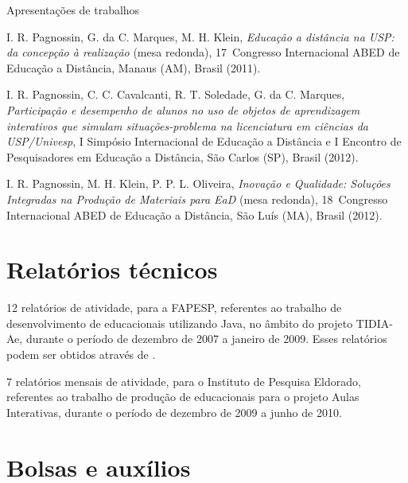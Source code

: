 \begin{compactitem}
	\item Apresentações de trabalhos
	\begin{compactitem}
		\item I. R. Pagnossin, G. da C. Marques, M. H. Klein, \textsl{Educação a distância na USP: da concepção à realização} (mesa redonda), 17\textordmasculine\ Congresso Internacional ABED de Educação a Distância, Manaus (AM), Brasil (2011).
		\item I. R. Pagnossin, C. C. Cavalcanti, R. T. Soledade, G. da C. Marques, \textsl{Participação e desempenho de alunos no uso de objetos de aprendizagem interativos que simulam situações-problema na licenciatura em ciências da USP/Univesp}, I Simpósio Internacional de Educação a Distância e I Encontro de Pesquisadores em Educação a Distância, São Carlos (SP), Brasil (2012).
		\item I. R. Pagnossin, M. H. Klein, P. P. L. Oliveira, \textsl{Inovação e Qualidade: Soluções Integradas na Produção de Materiais para EaD} (mesa redonda), 18\textordmasculine\ Congresso Internacional ABED de Educação a Distância, São Luís (MA), Brasil (2012).
	\end{compactitem}
\end{compactitem}

\section*{Relatórios técnicos}

\begin{compactitem}
	\item 12 relatórios de atividade, para a FAPESP, referentes ao trabalho de desenvolvimento de  educacionais utilizando Java, no âmbito do projeto TIDIA-Ae, durante o período de dezembro de 2007 a janeiro de 2009. Esses relatórios podem ser obtidos através de \cite{irpagnossin-stoa}.
	\item 7 relatórios mensais de atividade, para o Instituto de Pesquisa Eldorado, referentes ao trabalho de produção de  educacionais para o projeto Aulas Interativas, durante o período de dezembro de 2009 a junho de 2010.
\end{compactitem}

\section*{Bolsas e auxílios}


